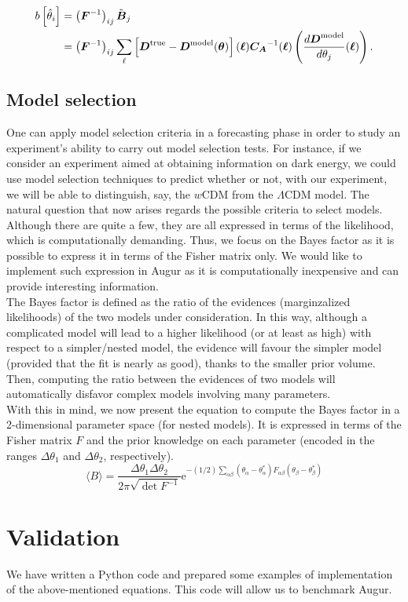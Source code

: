 \documentclass[modern]{lsstdescnote}
\begin{document}
\begin{align}
  \begin{split}
  b\left[\hat{\theta}_{i}\right]&=\left(\boldsymbol{F}^{-1}\right)_{i j} \Tilde{\boldsymbol{B}}_{j}\\
  &=\left(\boldsymbol{F}^{-1}\right)_{i j}\sum_{\ell}\left[\boldsymbol{D}^{\mathrm{true}}-\boldsymbol{D}^{\mathrm{model}}(\boldsymbol{\theta})\right](\boldsymbol{\ell})\boldsymbol{C_A}^{-1}(\boldsymbol{\ell})\left(\dfrac{d\boldsymbol{D}^{\mathrm{model}}}{d\theta_j}(\boldsymbol{\ell})\right).
  \end{split}
  \end{align}

\subsection{Model selection}
One can apply model selection criteria in a forecasting phase in order to study an experiment's ability to carry out model selection tests.
For instance, if we consider an experiment aimed at obtaining information on dark energy, we could use model selection techniques to predict whether or not,
with our experiment, we will be able to distinguish, say, the $w$CDM from the $\Lambda$CDM model.
The natural question that now arises regards the possible criteria to select models. Although there are quite a few, they are all expressed in terms of the likelihood,
which is computationally demanding. Thus, we focus on the Bayes factor as it is possible to express it in terms of the Fisher matrix only. We would like to implement
such expression in Augur as it is computationally inexpensive and can provide interesting information.\\
The Bayes factor is defined as the ratio of the evidences (marginzalized likelihoods) of the two models under consideration.
In this way, although a complicated model will lead to a higher likelihood (or at least as high) with respect to a simpler/nested model, the evidence will favour
the simpler model (provided that the fit is nearly as good), thanks to the smaller prior volume. 
Then, computing the ratio between the evidences of two models will automatically disfavor complex models involving many parameters.\\
With this in mind, we now present the equation to compute the Bayes factor in a 2-dimensional parameter space (for nested models). It is expressed in terms of the Fisher matrix $F$ and the prior knowledge
on each parameter (encoded in the ranges $\Delta \theta_{1}$ and $\Delta \theta_{2}$, respectively). 
\begin{equation}
  \langle B\rangle=\frac{\Delta \theta_{1} \Delta \theta_{2}}{2 \pi \sqrt{\operatorname{det} F^{-1}}} \mathrm{e}^{-(1 / 2) \sum_{\alpha \beta}\left(\theta_{\alpha}-\theta_{\alpha}^{*}\right) F_{\alpha \beta}\left(\theta_{\beta}-\theta_{\beta}^{*}\right)}
  \end{equation}
\section{Validation}
We have written a Python code and prepared some examples of implementation of the above-mentioned equations. This code will allow
us to benchmark Augur. 




\end{document}
